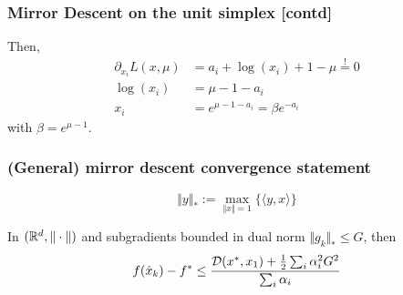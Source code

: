 \documentclass{beamer}
\begin{document}
\begin{frame}
  \frametitle{Mirror Descent on the unit simplex [contd]}
      Then,
      \begin{equation}
        \begin{aligned}
          \partial_{x_i} L(x,\mu) &= a_i + \log(x_i) +1 - \mu \overset{!}{=} 0 \\
          \log(x_i) &= \mu -1 - a_i  \\
          x_i &= e^{\mu - 1 - a_i} = \beta e^{-a_i}
        \end{aligned}
      \end{equation}
      with $\beta= e^{\mu-1}$.


\end{frame}

%
\begin{frame}
  \frametitle{(General) mirror descent convergence statement}
  \begin{equation}
    \Vert y \Vert_* := \max_{\Vert x \Vert=1} \{ \langle y, x \rangle\}
  \end{equation}
  \begin{theorem}
    In $(\mathbb{R}^d, \Vert \cdot \Vert)$ and subgradients bounded in dual norm $\Vert g_k \Vert_* \le G$, then
    \begin{equation}
      f(\hat{x}_k) - f^* \le \frac{\mathcal{D}(x^*, x_1) + \frac12 \sum_i \alpha_i^2 G^2}{\sum_i \alpha_i}
    \end{equation}
  \end{theorem}


\end{frame}

\end{document}
